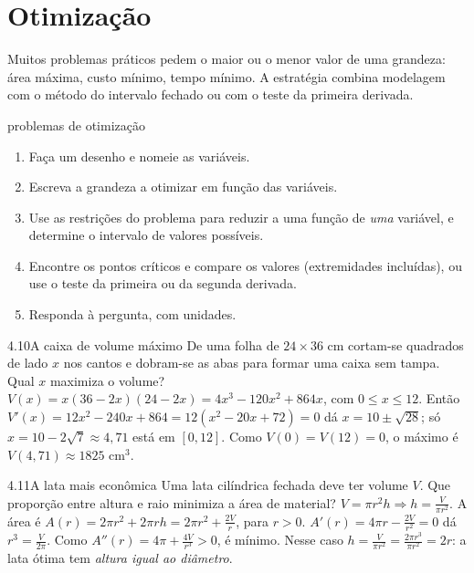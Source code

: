 \section{Otimização}

Muitos problemas práticos pedem o maior ou o menor valor de uma grandeza: área máxima, custo
mínimo, tempo mínimo. A estratégia combina modelagem com o método do intervalo fechado ou com
o teste da primeira derivada.

\begin{estrategia}{problemas de otimização}
\begin{enumerate}[label=\arabic*.]
\item Faça um desenho e nomeie as variáveis.
\item Escreva a grandeza a otimizar em função das variáveis.
\item Use as restrições do problema para reduzir a uma função de \emph{uma} variável, e
  determine o intervalo de valores possíveis.
\item Encontre os pontos críticos e compare os valores (extremidades incluídas), ou use o
  teste da primeira ou da segunda derivada.
\item Responda à pergunta, com unidades.
\end{enumerate}
\end{estrategia}

\begin{exemplo}{4.10}{A caixa de volume máximo}
De uma folha de $24\times36$ cm cortam-se quadrados de lado $x$ nos cantos e dobram-se as
abas para formar uma caixa sem tampa. Qual $x$ maximiza o volume?
\solucao
$V(x)=x(36-2x)(24-2x)=4x^3-120x^2+864x$, com $0\le x\le12$. Então
$V'(x)=12x^2-240x+864=12(x^2-20x+72)=0$ dá $x=10\pm\sqrt{28}$; só $x=10-2\sqrt7\approx4{,}71$
está em $[0,12]$. Como $V(0)=V(12)=0$, o máximo é $V(4{,}71)\approx1825$ cm$^3$.
\end{exemplo}

\begin{exemplo}{4.11}{A lata mais econômica}
Uma lata cilíndrica fechada deve ter volume $V$. Que proporção entre altura e raio minimiza a
área de material?
\solucao
$V=\pi r^2h\Rightarrow h=\frac V{\pi r^2}$. A área é
$A(r)=2\pi r^2+2\pi rh=2\pi r^2+\frac{2V}r$, para $r>0$. $A'(r)=4\pi r-\frac{2V}{r^2}=0$ dá
$r^3=\frac V{2\pi}$. Como $A''(r)=4\pi+\frac{4V}{r^3}>0$, é mínimo. Nesse caso
$h=\frac{V}{\pi r^2}=\frac{2\pi r^3}{\pi r^2}=2r$: a lata ótima tem \emph{altura igual ao
diâmetro}.
\end{exemplo}

